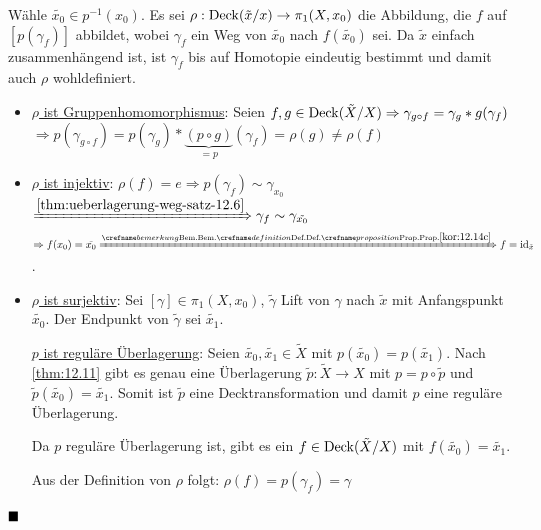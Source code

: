 \begin{beweis}
    Wähle $\tilde{x_0} \in p^{-1}(x_0)$. Es sei $\rho: \operatorname{Deck}(\tilde{x}/x) \rightarrow \pi_1(X, x_0)$
    die Abbildung, die $f$ auf $[p(\gamma_f)]$ abbildet, wobei $\gamma_f$
    ein Weg von $\tilde{x_0}$ nach $f(\tilde{x_0})$ sei. Da $\tilde{x}$
    einfach zusammenhängend ist, ist $\gamma_f$ bis auf Homotopie
    eindeutig bestimmt und damit auch $\rho$ wohldefiniert.

    \begin{itemize}
        \item \underline{$\rho$ ist Gruppenhomomorphismus}: Seien 
            $f, g \in \operatorname{Deck}(\tilde{X}/ X) \Rightarrow \gamma_{g \circ f} = \gamma_g * g(\gamma_f)$
            $\Rightarrow p(\gamma_{g \circ f}) = p(\gamma_g) * \underbrace{(p \circ g)}_{=p} (\gamma_f) = \rho(g) \neq \rho(f)$
        \item \underline{$\rho$ ist injektiv}: $\rho(f) = e \Rightarrow p (\gamma_f) \sim \gamma_{x_0}$
            $\xRightarrow{\cref{thm:ueberlagerung-weg-satz-12.6}} \gamma_f \sim \gamma_{\tilde{x_0}}$ 
            $\Rightarrow f(x_0) = \tilde{x_0} \xRightarrow{\crefabbr{kor:12.14c}} f = \id_{\tilde{x}}$.
        \item \underline{$\rho$ ist surjektiv}: Sei $[\gamma] \in \pi_1(X, x_0)$,
            $\tilde{\gamma}$ Lift von $\gamma$ nach $\tilde{x}$ mit
            Anfangspunkt $\tilde{x_0}$. Der Endpunkt von $\tilde{\gamma}$
            sei $\tilde{x_1}$.

            \underline{$p$ ist reguläre Überlagerung}: Seien
            $\tilde{x_0}, \tilde{x_1} \in \tilde{X}$ mit 
            $p(\tilde{x_0}) = p(\tilde{x_1})$. Nach \cref{thm:12.11}
            gibt es genau eine Überlagerung $\tilde{p}: \tilde{X} \rightarrow X$
            mit $p=p \circ \tilde{p}$ und $\tilde{p}(\tilde{x_0}) = \tilde{x_1}$.
            Somit ist $\tilde{p}$ eine Decktransformation und damit
            $p$ eine reguläre Überlagerung.

            Da $p$ reguläre Überlagerung ist, gibt es ein $f \in \operatorname{Deck}(\tilde{X}/X)$
            mit $f(\tilde{x_0}) = \tilde{x_1}$.

            Aus der Definition von $\rho$ folgt: $\rho(f) = p (\gamma_f) = \gamma$
    \end{itemize}
            $\qed$
\end{beweis}

